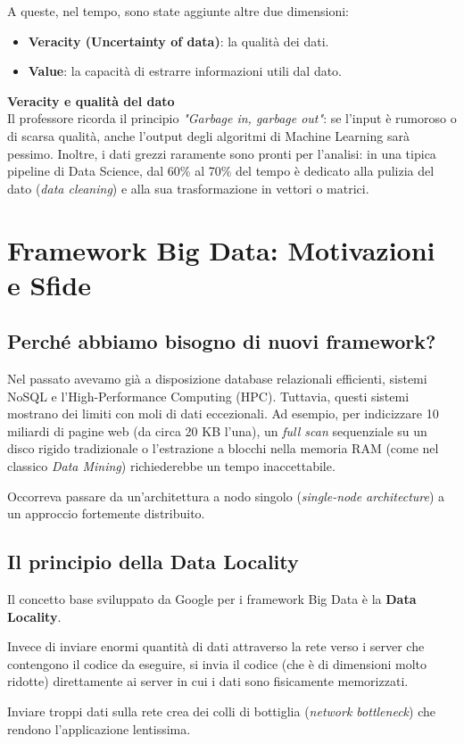 A queste, nel tempo, sono state aggiunte altre due dimensioni:
\begin{itemize}
    \item \textbf{Veracity (Uncertainty of data)}: la qualità dei dati.
    \item \textbf{Value}: la capacità di estrarre informazioni utili dal dato.
\end{itemize}

\begin{remark}
\textbf{Veracity e qualità del dato}\\
Il professore ricorda il principio \textit{"Garbage in, garbage out"}: se l'input è rumoroso o di scarsa qualità, anche l'output degli algoritmi di Machine Learning sarà pessimo. Inoltre, i dati grezzi raramente sono pronti per l'analisi: in una tipica pipeline di Data Science, dal 60\% al 70\% del tempo è dedicato alla pulizia del dato (\textit{data cleaning}) e alla sua trasformazione in vettori o matrici.
\end{remark}

\section{Framework Big Data: Motivazioni e Sfide}

\subsection{Perché abbiamo bisogno di nuovi framework?}
Nel passato avevamo già a disposizione database relazionali efficienti, sistemi NoSQL e l'High-Performance Computing (HPC). Tuttavia, questi sistemi mostrano dei limiti con moli di dati eccezionali. Ad esempio, per indicizzare 10 miliardi di pagine web (da circa 20 KB l'una), un \textit{full scan} sequenziale su un disco rigido tradizionale o l'estrazione a blocchi nella memoria RAM (come nel classico \textit{Data Mining}) richiederebbe un tempo inaccettabile. 

Occorreva passare da un'architettura a nodo singolo (\textit{single-node architecture}) a un approccio fortemente distribuito.

\subsection{Il principio della Data Locality}
Il concetto base sviluppato da Google per i framework Big Data è la \textbf{Data Locality}. 
\begin{definition}
Invece di inviare enormi quantità di dati attraverso la rete verso i server che contengono il codice da eseguire, si invia il codice (che è di dimensioni molto ridotte) direttamente ai server in cui i dati sono fisicamente memorizzati.
\end{definition}
Inviare troppi dati sulla rete crea dei colli di bottiglia (\textit{network bottleneck}) che rendono l'applicazione lentissima. 


